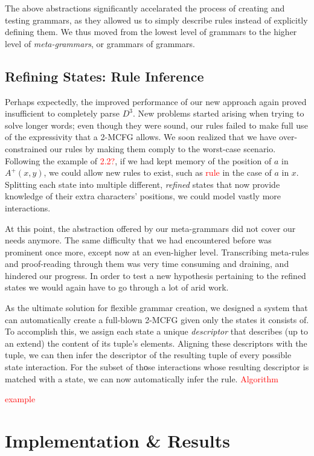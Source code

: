 \documentclass[nonatbib,numbers,10pt]{sigplanconf}
\newcommand\todo[1]{\textcolor{red}{#1}}
\begin{document}
The above abstractions significantly accelarated the process of creating and testing grammars, as they allowed us to simply describe rules instead of explicitly defining them. We thus moved from the lowest level of grammars to the higher level of \textit{meta-grammars}, or grammars of grammars. 

\subsection{Refining States: Rule Inference}
Perhaps expectedly, the improved performance of our new approach again proved insufficient to completely parse $D^3$. New problems started arising when trying to solve longer words; even though they were sound, our rules failed to make full use of the expressivity that a 2-MCFG allows. We soon realized that we have over-constrained our rules by making them comply to the worst-case scenario. Following the example of \todo{2.2?}, if we had kept memory of the position of $a$ in $A^{+}(x,y)$, we could allow new rules to exist, such as \todo{rule} in the case of $a$ in $x$. Splitting each state into multiple different, \textit{refined} states that now provide knowledge of their extra characters' positions, we could model vastly more interactions.

At this point, the abstraction offered by our meta-grammars did not cover our needs anymore. The same difficulty that we had encountered before was prominent once more, except now at an even-higher level. Transcribing meta-rules and proof-reading through them was very time consuming and draining, and hindered our progress. In order to test a new hypothesis pertaining to the refined states we would again have to go through a lot of arid work.

As the ultimate solution for flexible grammar creation, we designed a system that can automatically create a full-blown 2-MCFG given only the states it consists of. To accomplish this, we assign each state a unique \textit{descriptor} that describes (up to an extend) the content of its tuple's elements. Aligning these descriptors with the tuple, we can then infer the descriptor of the resulting tuple of every possible state interaction. For the subset of thοse interactions whose resulting descriptor is matched with a state, we can now automatically infer the rule.
\todo{Algorithm}

\todo{example}

\section{Implementation \& Results}
\end{document}
